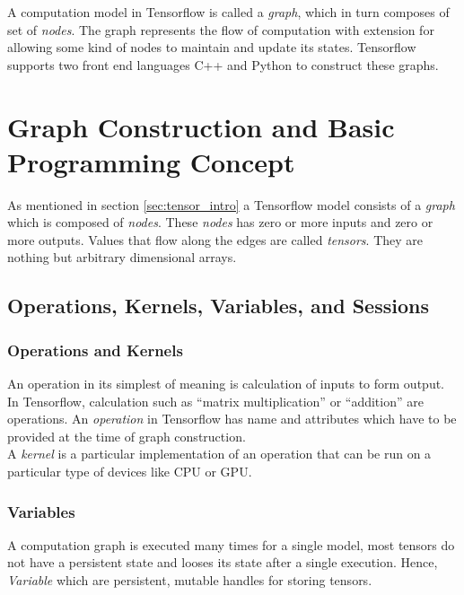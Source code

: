 \documentclass[12pt, a4paper]{report}
\begin{document}
A computation model in Tensorflow is called a \textit{graph}, which in turn composes of set of \textit{nodes}. The graph represents the flow of computation with extension for allowing some kind of nodes to maintain and update its states. Tensorflow supports two front end languages C++ and Python to construct these graphs.\\ \par
\clearpage

\section{Graph Construction and Basic Programming Concept}\label{sec:programmingtensorflow}

As mentioned in section \ref{sec:tensor_intro} a Tensorflow model consists of a \textit{graph} which is composed of \textit{nodes}. These \textit{nodes} has zero or more inputs and zero or more outputs. Values that flow along the edges are called \textit{tensors}. They are nothing but arbitrary dimensional arrays.\\ \par

\subsection{Operations, Kernels, Variables, and Sessions}\label{sec:constituentsoftensorflow}

\subsubsection{Operations and Kernels}\label{sec:ops_kernel}
An operation in its simplest of meaning is calculation of inputs to form output. In Tensorflow, calculation such as ``matrix multiplication'' or ``addition'' are operations. An \textit{operation} in Tensorflow has name and attributes which have to be provided at the time of graph construction. \\ 

A \textit{kernel} is a particular implementation of an operation that can be run on a particular type of devices like CPU or GPU. 


\subsubsection{Variables}\label{variables}
A computation graph is executed many times for a single model, most tensors do not have a persistent state and looses its state after a single execution. Hence, \textit{Variable} which are persistent, mutable handles for storing tensors.
\end{document}
